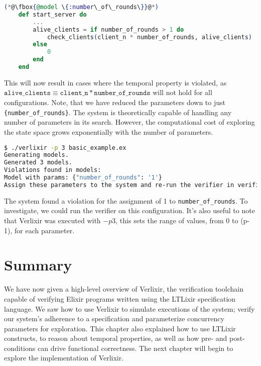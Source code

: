 \begin{lstlisting}[language=Elixir, xleftmargin=.1\linewidth]
    (*@\fbox{@model \{:number\_of\_rounds\}}@*)
    def start_server do
        ...
        alive_clients = if number_of_rounds > 1 do
            check_clients(client_n * number_of_rounds, alive_clients)
        else
            0
        end
    end
\end{lstlisting}
This will now result in cases where the temporal property is violated, as $\texttt{alive\_clients} \equiv \texttt{client\_n} * \texttt{number\_of\_rounds}$ will not hold for all configurations. Note, that we have reduced the parameters down to just \texttt{\{number\_of\_rounds\}}. The system is theoretically capable of handling any number of parameters in its search. However, the computational cost of exploring the state space grows exponentially with the number of parameters.
\begin{lstlisting}[language=bash, xleftmargin=.1\linewidth]
$ ./verlixir -p 3 basic_example.ex
Generating models.
Generated 3 models.
Violations found in models:
Model with params: {"number_of_rounds": '1'}
Assign these parameters to the system and re-run the verifier in verification mode to gather a trace.
\end{lstlisting}
The system found a violation for the assignment of 1 to \texttt{number\_of\_rounds}. To investigate, we could run the verifier on this configuration. It's also useful to note that Verlixir was executed with $-p 3$, this sets the range of values, from 0 to (p-1), for each parameter. 
\section{Summary}
We have now given a high-level overview of Verlixir, the verification toolchain capable of verifying Elixir programs written using the LTLixir specification language. We saw how to use Verlixir to simulate executions of the system; verify our system's adherence to a specification and parameterize concurrency parameters for exploration. This chapter also explained how to use LTLixir constructs, to reason about temporal properties, as well as how pre- and post-conditions can drive functional correctness. The next chapter will begin to explore the implementation of Verlixir.